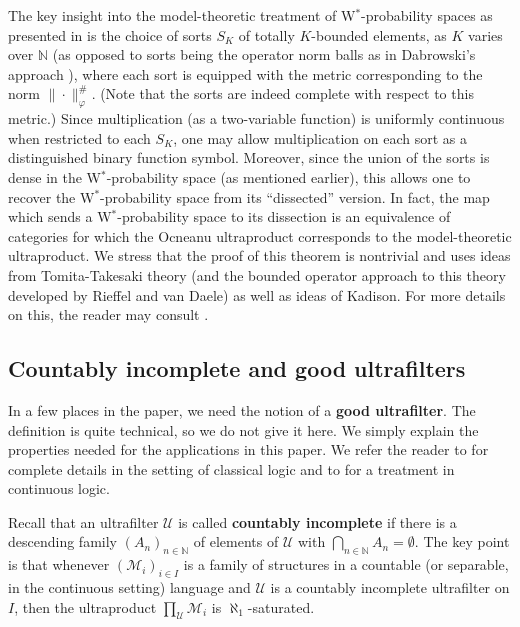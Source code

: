 \documentclass[12pt]{amsart}
\theoremstyle{definition}
\def\bb{\mathbb}
\def\bb{\mathbb}
\def\cal{\mathcal}
\def\u{\mathsf 1}
\def \u{\mathcal U}
\begin{document}
The key insight into the model-theoretic treatment of W$^*$-probability spaces as presented in \cite{AGHS25} is the choice of sorts $S_K$ of totally $K$-bounded elements, as $K$ varies over $\bb N$ (as opposed to sorts being the operator norm balls as in Dabrowski's approach \cite{dabrowski2019continuous}), where each sort is equipped with the metric corresponding to the norm $\|\cdot\|_\varphi^\#$.  (Note that the sorts are indeed complete with respect to this metric.)  Since multiplication (as a two-variable function) is uniformly continuous when restricted to each $S_K$, one may allow multiplication on each sort as a distinguished binary function symbol.  Moreover, since the union of the sorts is dense in the W$^*$-probability space (as mentioned earlier), this allows one to recover the W$^*$-probability space from its ``dissected'' version.  In fact, the map which sends a W$^*$-probability space to its dissection is an equivalence of categories for which the Ocneanu ultraproduct corresponds to the model-theoretic ultraproduct.  We stress that the proof of this theorem is nontrivial and uses ideas from Tomita-Takesaki theory (and the bounded operator approach to this theory developed by Rieffel and van Daele) as well as ideas of Kadison.  For more details on this, the reader may consult \cite{AGHS25}.

\subsection{Countably incomplete and good ultrafilters}\label{good}

In a few places in the paper, we need the notion of a \textbf{good ultrafilter}.  The definition is quite technical, so we do not give it here.  We simply explain the properties needed for the applications in this paper.  We refer the reader to \cite[Chapter 8]{goldbring2022ultrafilters} for complete details in the setting of classical logic and to \cite{keisler2024using} for a treatment in continuous logic.

Recall that an ultrafilter $\u$ is called \textbf{countably incomplete} if there is a  descending family $(A_n)_{n\in \bb N}$ of elements of $\u$ with $\bigcap_{n\in \bb N}A_n=\emptyset$.  The key point is that whenever $(\cal M_i)_{i\in I}$ is a family of structures in a countable (or separable, in the continuous setting) language and $\u$ is a countably incomplete ultrafilter on $I$, then the ultraproduct $\prod_\u \cal M_i$ is $\aleph_1$-saturated.
\end{document}
